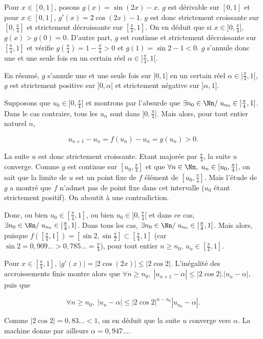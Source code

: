 {{Pour $x\in[0,1]$, posons $g(x)=\sin(2x)-x$. $g$ est dérivable sur $[0,1]$ et pour $x\in[0,1]$, $g'(x)=2\cos(2x)-1$. $g$ est donc strictement croissante sur $[0,\frac{\pi}{4}]$ et strictement décroissante sur $[\frac{\pi}{4},1]$. On en déduit que si $x\in]0,\frac{\pi}{4}]$, $g(x)>g(0)=0$. D'autre part, $g$ est continue et strictement décroissante sur $[\frac{\pi}{4},1]$ et vérifie $g(\frac{\pi}{4})=1-\frac{\pi}{4}>0$ et $g(1)=\sin2-1<0$. $g$ s'annule donc une et une seule fois en un certain réel $\alpha\in]\frac{\pi}{4},1[$.

En résumé, $g$ s'annule une et une seule fois sur $]0,1]$ en un certain réel $\alpha\in]\frac{\pi}{4},1[$, $g$ est strictement positive sur $]0,\alpha[$ et strictement négative sur $]\alpha,1]$.

Supposons que $u_0\in]0,\frac{\pi}{4}[$ et montrons par l'absurde que $\exists n_0\in\Nn/\;u_{n_0}\in[\frac{\pi}{4},1]$. Dans le cas contraire, tous les $u_n$ sont dans $]0,\frac{\pi}{4}[$. Mais alors, pour tout entier naturel $n$,

$$u_{n+1}-u_n=f(u_n)-u_n=g(u_n)>0.$$

La suite $u$ est donc strictement croissante. Etant majorée par $\frac{\pi}{4}$, la suite $u$ converge. Comme $g$ est continue sur $[u_0,\frac{\pi}{4}]$ et que $\forall n\in\Nn,\;u_n\in[u_0,\frac{\pi}{4}]$, on sait que la limite de $u$ est un point fixe de $f$ élément de $[u_0,\frac{\pi}{4}]$. Mais l'étude de $g$ a montré que $f$ n'admet pas de point fixe dans cet intervalle ($u_0$ étant strictement positif). On aboutit à une contradiction.

Donc, ou bien $u_0\in[\frac{\pi}{4},1]$, ou bien $u_0\in]0,\frac{\pi}{4}[$ et dans ce cas, $\exists n_0\in\Nn/\;u_{n_0}\in[\frac{\pi}{4},1]$. Dans tous les cas, $\exists n_0\in\Nn/\;u_{n_0}\in[\frac{\pi}{4},1]$. Mais alors, puisque $f([\frac{\pi}{4},1])=[\sin2,\sin\frac{\pi}{2}]\subset[\frac{\pi}{4},1]$ (car $\sin2=0,909...>0,785...=\frac{\pi}{4}$), pour tout entier $n\geq n_0$, $u_n\in[\frac{\pi}{4},1]$.

Pour $x\in[\frac{\pi}{4},1]$, $|g'(x)|=|2\cos(2x)|\leq|2\cos2|$. L'inégalité des accroissements finis montre alors que $\forall n\geq n_0,\;|u_{n+1}-\alpha|\leq|2\cos2|.|u_n-\alpha|$, puis que 

$$\forall n\geq n_0,\;|u_n-\alpha|\leq|2\cos2|^{n-n_0}|u_{n_0}-\alpha|.$$

Comme $|2\cos2|=0,83...<1$, on en déduit que la suite $u$ converge vers $\alpha$. La machine donne par ailleurs $\alpha=0,947...$.

}}
